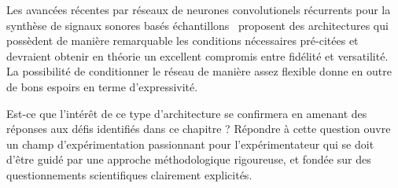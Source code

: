 Les avancées récentes par réseaux de neurones convolutionels récurrents pour la synthèse de signaux sonores basés échantillons~\cite{wavenet} proposent des architectures qui possèdent de manière remarquable les conditions nécessaires pré-citées et devraient obtenir en théorie un excellent compromis entre fidélité et versatilité. La possibilité de conditionner le réseau de manière assez flexible donne en outre de bons espoirs en terme d'expressivité.

Est-ce que l'intérêt de ce type d'architecture se confirmera en amenant des réponses aux défis identifiés dans ce chapitre ? Répondre à cette question ouvre un champ d'expérimentation passionnant pour l'expérimentateur qui se doit d'être guidé par une approche méthodologique rigoureuse, et fondée sur des questionnements scientifiques clairement explicités.
